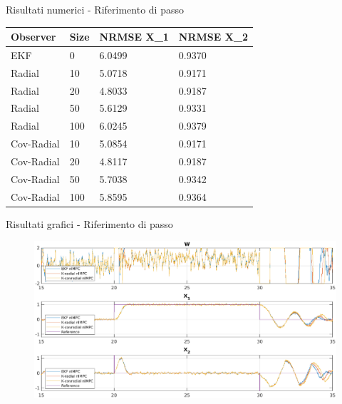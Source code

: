 \documentclass{beamer}
\begin{document}
\begin{frame}{Risultati numerici - Riferimento di passo}
    \begin{table}[]
        \begin{tabular}{|llll|}
        \hline
        \textbf{Observer} & \textbf{Size} & \textbf{NRMSE X\_1} & \textbf{NRMSE X\_2} \\    \hline
        EKF         &   0   &   6.0499  &   0.9370  \\  \hline
        Radial      &   10  &   5.0718   &   0.9171  \\
        Radial      &   20  &   4.8033  &   0.9187  \\
        Radial      &   50  &   5.6129  &   0.9331  \\
        Radial      &   100 &   6.0245  &   0.9379  \\  \hline
        Cov-Radial  &   10  &   5.0854  &   0.9171  \\
        Cov-Radial  &   20  &   4.8117  &   0.9187  \\
        Cov-Radial  &   50  &   5.7038  &   0.9342  \\
        Cov-Radial  &   100 &   5.8595  &   0.9364  \\ \hline
        \end{tabular}
        \end{table}
\end{frame}

\begin{frame}{Risultati grafici - Riferimento di passo}
    \begin{figure}
        \centering
        \includegraphics[width=\textwidth]{Figures/step_reference.eps}
    \end{figure}
\end{frame}
\end{document}
